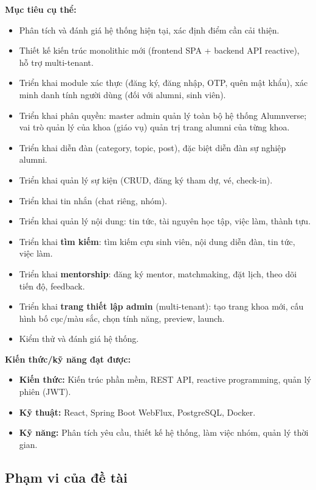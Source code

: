 \documentclass[12pt,a4paper]{article}
\begin{document}
\textbf{Mục tiêu cụ thể:}

\begin{itemize}
    \item Phân tích và đánh giá hệ thống hiện tại, xác định điểm cần cải thiện.
    \item Thiết kế kiến trúc monolithic mới (frontend SPA + backend API reactive), hỗ trợ multi-tenant.
    \item Triển khai module xác thực (đăng ký, đăng nhập, OTP, quên mật khẩu), xác minh danh tính người dùng (đối với alumni, sinh viên).
    \item Triển khai phân quyền: master admin quản lý toàn bộ hệ thống Alumnverse; vai trò quản lý của khoa (giáo vụ) quản trị trang alumni của từng khoa.
    \item Triển khai diễn đàn (category, topic, post), đặc biệt diễn đàn sự nghiệp alumni.
    \item Triển khai quản lý sự kiện (CRUD, đăng ký tham dự, vé, check-in).
    \item Triển khai tin nhắn (chat riêng, nhóm).
    \item Triển khai quản lý nội dung: tin tức, tài nguyên học tập, việc làm, thành tựu.
    \item Triển khai \textbf{tìm kiếm}: tìm kiếm cựu sinh viên, nội dung diễn đàn, tin tức, việc làm.
    \item Triển khai \textbf{mentorship}: đăng ký mentor, matchmaking, đặt lịch, theo dõi tiến độ, feedback.
    \item Triển khai \textbf{trang thiết lập admin} (multi-tenant): tạo trang khoa mới, cấu hình bố cục/màu sắc, chọn tính năng, preview, launch.
    \item Kiểm thử và đánh giá hệ thống.
\end{itemize}

\textbf{Kiến thức/kỹ năng đạt được:}

\begin{itemize}
    \item \textbf{Kiến thức:} Kiến trúc phần mềm, REST API, reactive programming, quản lý phiên (JWT).
    \item \textbf{Kỹ thuật:} React, Spring Boot WebFlux, PostgreSQL, Docker.
    \item \textbf{Kỹ năng:} Phân tích yêu cầu, thiết kế hệ thống, làm việc nhóm, quản lý thời gian.
\end{itemize}

\subsection{Phạm vi của đề tài}
\end{document}
